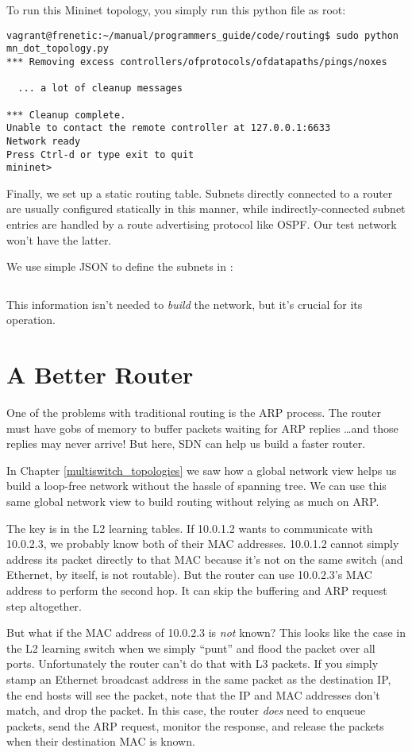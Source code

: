 To run this Mininet topology, you simply run this python file as root:

\begin{verbatim}
vagrant@frenetic:~/manual/programmers_guide/code/routing$ sudo python mn_dot_topology.py
*** Removing excess controllers/ofprotocols/ofdatapaths/pings/noxes

  ... a lot of cleanup messages 

*** Cleanup complete.
Unable to contact the remote controller at 127.0.0.1:6633
Network ready
Press Ctrl-d or type exit to quit
mininet>
\end{verbatim} 

Finally, we set up a static routing table.   Subnets directly connected to a router are usually 
configured statically in this manner, while indirectly-connected subnet entries are handled by
a route advertising protocol like OSPF.  Our test network won't have the latter.

We use simple JSON to define the subnets in :

\inputminted{json}{code/routing/routing_table.json}

This information isn't needed to \emph{build} the network, but it's crucial for its operation.

\section{A Better Router}

One of the problems with traditional routing is the ARP process.  The router must have gobs of memory 
to buffer packets waiting for ARP replies \ldots and those replies may never arrive!  But here, SDN 
can help us build a faster router.

In Chapter \ref{multiswitch_topologies} we saw how a global network view helps us build a loop-free
network without the hassle of spanning tree.  We can use this same global network view to build
routing without relying as much on ARP.  

The key is in the L2 learning tables.  If 10.0.1.2 wants to communicate with 10.0.2.3, we probably know
both of their MAC addresses.  10.0.1.2 cannot simply address its packet directly to that MAC because
it's not on the same switch (and Ethernet, by itself, is not routable).  But the router can use 
10.0.2.3's MAC address to perform the second hop.  It can skip the buffering and ARP request step
altogether.

But what if the MAC address of 10.0.2.3 is \emph{not} known?  
This looks like the case in the L2 learning switch when we simply ``punt'' and flood the packet
over all ports.  
Unfortunately the router can't do that with L3 packets.  If you simply stamp an Ethernet broadcast
address in the same packet as the destination IP, the end hosts will see the packet, note that 
the IP and MAC addresses don't match, and drop the packet.
In this case, the router \emph{does} need
to enqueue packets, send the ARP request, monitor the response, and release the packets when 
their destination MAC is known.   

